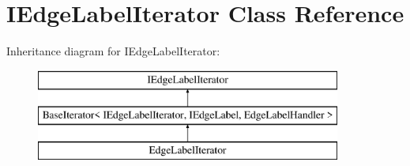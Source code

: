 \hypertarget{class_i_edge_label_iterator}{}\section{I\+Edge\+Label\+Iterator Class Reference}
\label{class_i_edge_label_iterator}
Inheritance diagram for I\+Edge\+Label\+Iterator\+:\begin{figure}[H]
\begin{center}
\leavevmode
\includegraphics[height=3.000000cm]{class_i_edge_label_iterator}
\end{center}
\end{figure}
